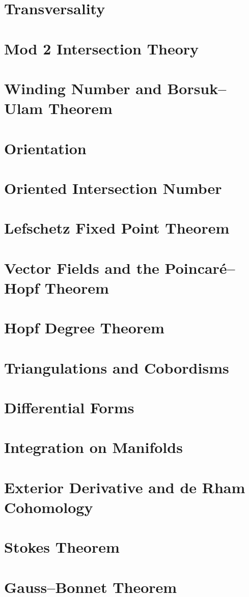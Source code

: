 \documentclass[12pt, a4paper]{report}
\begin{document}
\chapter{Transversality}


\chapter{Mod 2 Intersection Theory}


\chapter{Winding Number and Borsuk--Ulam Theorem}


\chapter{Orientation}


\chapter{Oriented Intersection Number}


\chapter{Lefschetz Fixed Point Theorem}


\chapter{Vector Fields and the Poincar\'e--Hopf Theorem}


\chapter{Hopf Degree Theorem}


\chapter{Triangulations and Cobordisms}


\chapter{Differential Forms}


\chapter{Integration on Manifolds}


\chapter{Exterior Derivative and de Rham Cohomology}


\chapter{Stokes Theorem}


\chapter{Gauss--Bonnet Theorem}

\end{document}
